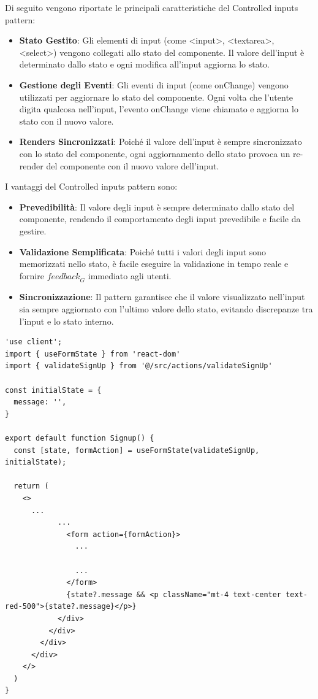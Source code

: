 Di seguito vengono riportate le principali caratteristiche del Controlled inputs pattern:
\begin{itemize}
    \item \textbf{Stato Gestito}: Gli elementi di input (come <input>, <textarea>, <select>) vengono collegati allo stato del componente. Il valore dell'input è determinato dallo stato e ogni modifica all'input aggiorna lo stato.
    \item \textbf{Gestione degli Eventi}: Gli eventi di input (come onChange) vengono utilizzati per aggiornare lo stato del componente. Ogni volta che l'utente digita qualcosa nell'input, l'evento onChange viene chiamato e aggiorna lo stato con il nuovo valore.
    \item \textbf{Renders Sincronizzati}: Poiché il valore dell'input è sempre sincronizzato con lo stato del componente, ogni aggiornamento dello stato provoca un re-render del componente con il nuovo valore dell'input.
\end{itemize}
I vantaggi del Controlled inputs pattern sono:
\begin{itemize}
    \item \textbf{Prevedibilità}: Il valore degli input è sempre determinato dallo stato del componente, rendendo il comportamento degli input prevedibile e facile da gestire.
    \item \textbf{Validazione Semplificata}: Poiché tutti i valori degli input sono memorizzati nello stato, è facile eseguire la validazione in tempo reale e fornire $\textit{feedback}_G$ immediato agli utenti.
    \item \textbf{Sincronizzazione}: Il pattern garantisce che il valore visualizzato nell'input sia sempre aggiornato con l'ultimo valore dello stato, evitando discrepanze tra l'input e lo stato interno.
\end{itemize}
\begin{lstlisting}[style=ES6, caption={Esempio dell'uso del Controlled inputs pattern}]
'use client';
import { useFormState } from 'react-dom'
import { validateSignUp } from '@/src/actions/validateSignUp'

const initialState = {
  message: '',
}

export default function Signup() {
  const [state, formAction] = useFormState(validateSignUp, initialState);
  
  return (
    <>
      ...
            ...
              <form action={formAction}>
                ...

                ...
              </form>
              {state?.message && <p className="mt-4 text-center text-red-500">{state?.message}</p>}
            </div>
          </div>
        </div>
      </div>
    </>
  )
}
\end{lstlisting}
\newpage
